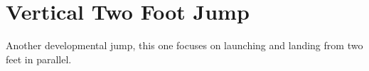 \section{Vertical Two Foot Jump}

Another developmental jump, this one focuses on launching and landing from two feet in parallel. 



